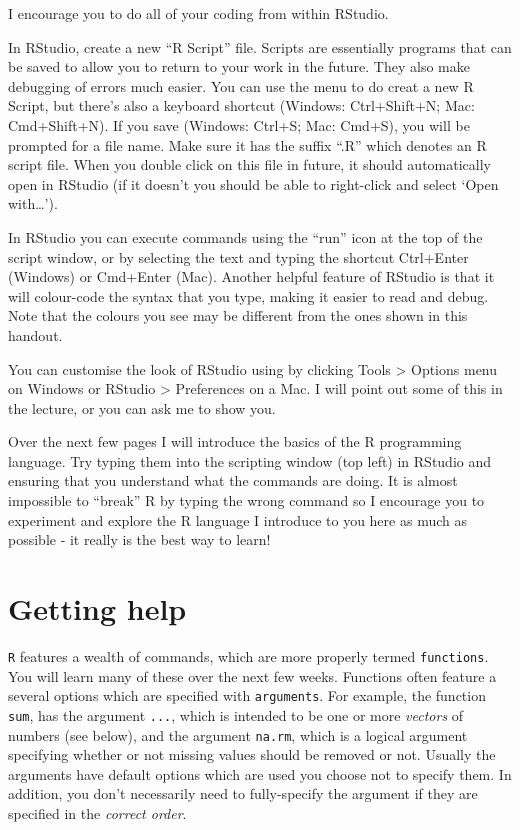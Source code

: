 \documentclass[
  a4paperpaper,
]{book}
\begin{document}
I encourage you to do all of your coding from within RStudio.

In RStudio, create a new ``R Script'' file. Scripts are essentially programs that can be saved to allow you to return to your work in the future. They also make debugging of errors much easier. You can use the menu to do creat a new R Script, but there's also a keyboard shortcut (Windows: Ctrl+Shift+N; Mac: Cmd+Shift+N). If you save (Windows: Ctrl+S; Mac: Cmd+S), you will be prompted for a file name. Make sure it has the suffix ``.R'' which denotes an R script file. When you double click on this file in future, it should automatically open in RStudio (if it doesn't you should be able to right-click and select `Open with\ldots{}').

In RStudio you can execute commands using the ``run'' icon at the top of the script window, or by selecting the text and typing the shortcut Ctrl+Enter (Windows) or Cmd+Enter (Mac). Another helpful feature of RStudio is that it will colour-code the syntax that you type, making it easier to read and debug. Note that the colours you see may be different from the ones shown in this handout.

You can customise the look of RStudio using by clicking Tools \textgreater{} Options menu on Windows or RStudio \textgreater{} Preferences on a Mac. I will point out some of this in the lecture, or you can ask me to show you.

Over the next few pages I will introduce the basics of the R programming language. Try typing them into the scripting window (top left) in RStudio and ensuring that you understand what the commands are doing. It is almost impossible to ``break'' R by typing the wrong command so I encourage you to experiment and explore the R language I introduce to you here as much as possible - it really is the best way to learn!

\hypertarget{getting-help}{%
\section{Getting help}\label{getting-help}}

\texttt{R} features a wealth of commands, which are more properly termed \texttt{functions}. You will learn many of these over the next few weeks. Functions often feature a several options which are specified with \texttt{arguments}. For example, the function \texttt{sum}, has the argument \texttt{...}, which is intended to be one or more \emph{vectors} of numbers (see below), and the argument \texttt{na.rm}, which is a logical argument specifying whether or not missing values should be removed or not. Usually the arguments have default options which are used you choose not to specify them. In addition, you don't necessarily need to fully-specify the argument if they are specified in the \emph{correct order}.
\end{document}

